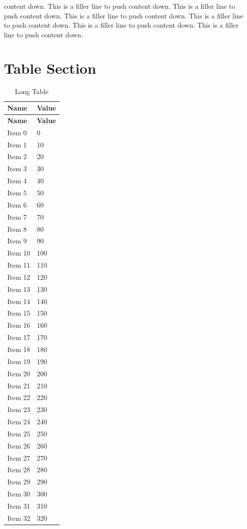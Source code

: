 \documentclass[11pt,a4paper]{report}
\begin{document}
content down. This is a filler line to push content down. This is a filler line to push content down. This is a filler line to push content down. This is a filler line to push content down. This is a filler line to push content down. This is a filler line to push content down. 
\section{Table Section}
\begin{longtable}{|l|l|}
\caption{Long Table}
\hline
\textbf{Name} & \textbf{Value} \\
\hline
\endfirsthead
\hline
\textbf{Name} & \textbf{Value} \\
\hline
\endhead
Item 0 & 0 \\
Item 1 & 10 \\
Item 2 & 20 \\
Item 3 & 30 \\
Item 4 & 40 \\
Item 5 & 50 \\
Item 6 & 60 \\
Item 7 & 70 \\
Item 8 & 80 \\
Item 9 & 90 \\
Item 10 & 100 \\
Item 11 & 110 \\
Item 12 & 120 \\
Item 13 & 130 \\
Item 14 & 140 \\
Item 15 & 150 \\
Item 16 & 160 \\
Item 17 & 170 \\
Item 18 & 180 \\
Item 19 & 190 \\
Item 20 & 200 \\
Item 21 & 210 \\
Item 22 & 220 \\
Item 23 & 230 \\
Item 24 & 240 \\
Item 25 & 250 \\
Item 26 & 260 \\
Item 27 & 270 \\
Item 28 & 280 \\
Item 29 & 290 \\
Item 30 & 300 \\
Item 31 & 310 \\
Item 32 & 320 \\

\end{longtable}
\end{document}
